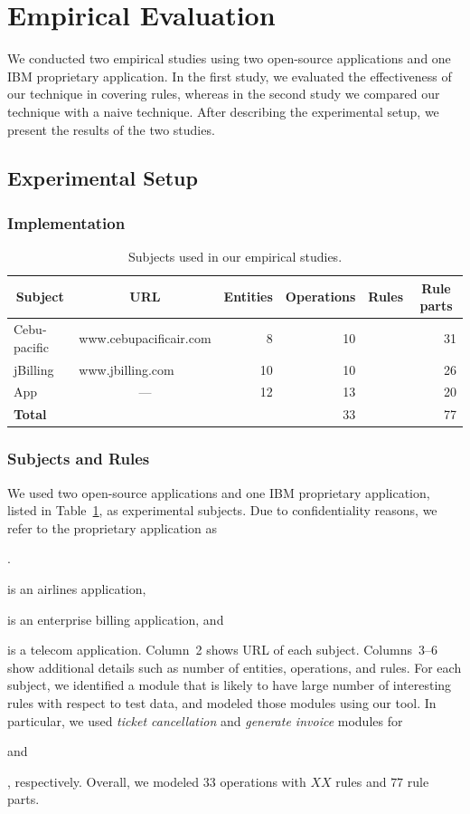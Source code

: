 \section{Empirical Evaluation}
\label{sec:eval}


We conducted two empirical studies using two open-source applications 
and one IBM proprietary application. In the first study, we evaluated the
effectiveness of our technique in covering rules, whereas in the second study
we compared our technique with a naive technique. After describing the experimental setup,
we present the results of the two studies.

\subsection{Experimental Setup}

\subsubsection{Implementation}
\label{sec:impl}


\begin{table}[t]
\caption{Subjects used in our empirical studies.}
\centering
{\scriptsize
\tabcolsep=3pt
\begin{tabular}{|l|l|r|r|r|r|}
\hline
\multicolumn{1}{|c|}{Subject} & \multicolumn{1}{|c|}{URL} & \multicolumn{1}{|c|}{Entities} & \multicolumn{1}{|c|}{Operations} & \multicolumn{1}{|c|}{Rules} & \multicolumn{1}{|c|}{Rule parts} \\
\hline \hline
Cebu-pacific & www.cebupacificair.com 		& 8  & 10 &  	 & 31 \\
jBilling 		 & www.jbilling.com 					& 10 & 10 &   	 & 26 \\
App 				 & \multicolumn{1}{|c|}{---}	& 12 & 13 &     & 20 \\
\hline \hline
\textbf{Total} & 													& 	 & 33 &     & 77 \\
\hline
\end{tabular}
}
\label{tab:subjects}
\end{table}

\subsubsection{Subjects and Rules}

We used two open-source applications and one IBM proprietary application, listed
in Table~\ref{tab:subjects}, as experimental subjects. Due to confidentiality reasons,
we refer to the proprietary application as \subject{App}. \subject{Cebu-pacific} is
an airlines application, \subject{jBilling} is an enterprise billing application,
and \subject{App} is a telecom application. Column~2 shows URL of each subject.
Columns~3--6 show additional details such as number of entities, operations,
and rules. For each subject, we identified a module that is likely to have large
number of interesting rules with respect to test data, and modeled those modules using our tool. In particular,
we used \textit{ticket cancellation} and \textit{generate invoice} modules for \subject{Cebu-pacific} and 
\subject{jBilling}, respectively. Overall, we modeled $33$ operations with $XX$ rules and
$77$ rule parts.


